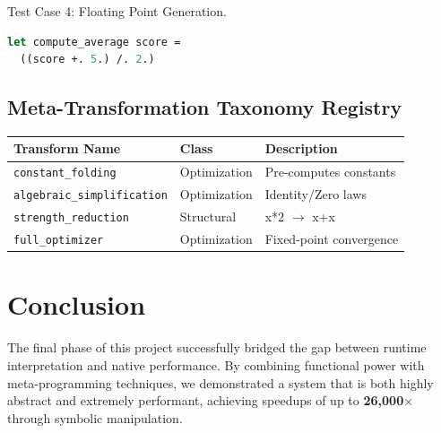 \documentclass[12pt]{article}
\begin{document}
Test Case 4: Floating Point Generation.
\begin{lstlisting}[language=Caml]
let compute_average score =
  ((score +. 5.) /. 2.)
\end{lstlisting}

\subsection*{Meta-Transformation Taxonomy Registry}
\begin{tabular}{lll}
    \toprule
    \textbf{Transform Name} & \textbf{Class} & \textbf{Description} \\
    \midrule
    \texttt{constant\_folding} & Optimization & Pre-computes constants \\
    \texttt{algebraic\_simplification} & Optimization & Identity/Zero laws \\
    \texttt{strength\_reduction} & Structural & x*2 $\to$ x+x \\
    \texttt{full\_optimizer} & Optimization & Fixed-point convergence \\
    \bottomrule
\end{tabular}

\section*{Conclusion}
The final phase of this project successfully bridged the gap between runtime interpretation and native performance. By combining functional power with meta-programming techniques, we demonstrated a system that is both highly abstract and extremely performant, achieving speedups of up to \textbf{26,000$\times$} through symbolic manipulation.
\end{document}
